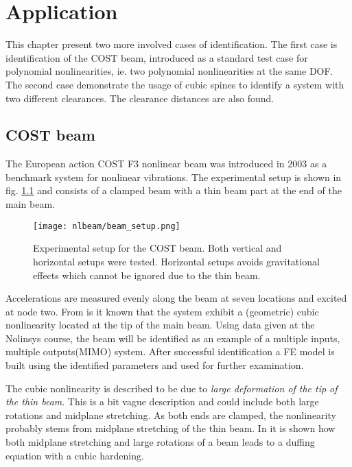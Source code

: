 
\chapter{Application}
\label{cha:application}

This chapter present two more involved cases of identification. The first case
is identification of the COST beam, introduced as a standard test case for
polynomial nonlinearities, ie. two polynomial nonlinearities at the same DOF.
The second case demonstrate the usage of cubic spines to identify a system with
two different clearances. The clearance distances are also found.


\section{COST beam}
\label{sec:cost-beam}

The European action COST F3 nonlinear beam \autocite{GOLINVAL2003} was
introduced in 2003 as a benchmark system for nonlinear vibrations. The
experimental setup is shown in fig. \ref{fig:beam_setup} and consists of a
clamped beam with a thin beam part at the end of the main beam.

\begin{figure}[!ht]
  \centering
  \texttt{[image: nlbeam/beam\_setup.png]}
  \caption{Experimental setup for the COST beam. Both vertical and horizontal
    setups were tested. Horizontal setups avoids gravitational effects which
    cannot be ignored due to the thin beam.}
  \label{fig:beam_setup}
\end{figure}


Accelerations are measured evenly along the beam at seven locations and excited
at node two.
From \textcite{lenaerts2003a} is it known that the system exhibit a (geometric)
cubic nonlinearity located at the tip of the main beam. Using data given at the
Nolinsys course, the beam will be identified as an example of a multiple inputs,
multiple outputs(MIMO) system. After successful identification a FE model is
built using the identified parameters and used for further examination.

The cubic nonlinearity is described to be due to \textit{large deformation of the
  tip of the thin beam}. This is a bit vague description and could include both
large rotations and midplane stretching. As both ends are clamped, the
nonlinearity probably stems from midplane stretching of the thin beam.
In \autocite{juel2003a} it is shown how both midplane stretching and large
rotations of a beam leads to a duffing equation with a cubic hardening.

